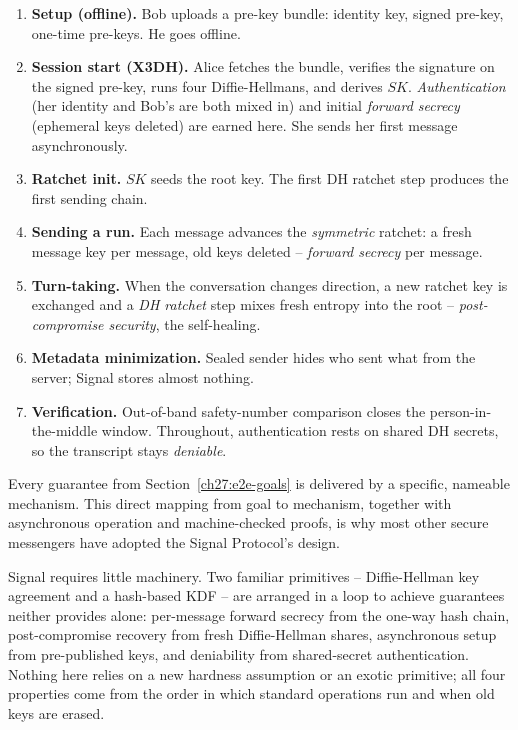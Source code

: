 \begin{enumerate}
  \item \textbf{Setup (offline).} Bob uploads a pre-key bundle: identity key, signed pre-key, one-time pre-keys. He goes offline.
  \item \textbf{Session start (X3DH).} Alice fetches the bundle, verifies the signature on the signed pre-key, runs four Diffie-Hellmans, and derives $SK$. \emph{Authentication} (her identity and Bob's are both mixed in) and initial \emph{forward secrecy} (ephemeral keys deleted) are earned here. She sends her first message asynchronously.
  \item \textbf{Ratchet init.} $SK$ seeds the root key. The first DH ratchet step produces the first sending chain.
  \item \textbf{Sending a run.} Each message advances the \emph{symmetric} ratchet: a fresh message key per message, old keys deleted -- \emph{forward secrecy} per message.
  \item \textbf{Turn-taking.} When the conversation changes direction, a new ratchet key is exchanged and a \emph{DH ratchet} step mixes fresh entropy into the root -- \emph{post-compromise security}, the self-healing.
  \item \textbf{Metadata minimization.} Sealed sender hides who sent what from the server; Signal stores almost nothing.
  \item \textbf{Verification.} Out-of-band safety-number comparison closes the person-in-the-middle window. Throughout, authentication rests on shared DH secrets, so the transcript stays \emph{deniable}.
\end{enumerate}

Every guarantee from Section~\ref{ch27:e2e-goals} is delivered by a specific, nameable mechanism. This direct mapping from goal to mechanism, together with asynchronous operation and machine-checked proofs, is why most other secure messengers have adopted the Signal Protocol's design.

\begin{aestheticbox}
Signal requires little machinery. Two familiar primitives -- Diffie-Hellman key agreement and a hash-based KDF -- are arranged in a loop to achieve guarantees neither provides alone: per-message forward secrecy from the one-way hash chain, post-compromise recovery from fresh Diffie-Hellman shares, asynchronous setup from pre-published keys, and deniability from shared-secret authentication. Nothing here relies on a new hardness assumption or an exotic primitive; all four properties come from the order in which standard operations run and when old keys are erased.
\end{aestheticbox}

